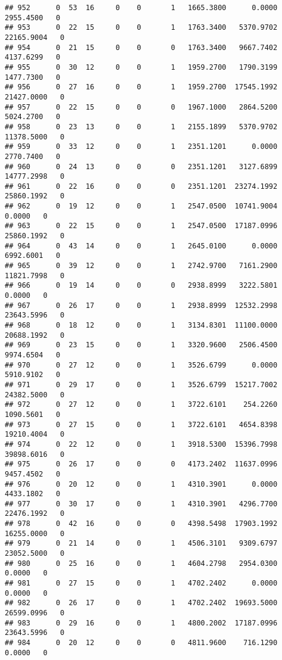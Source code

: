 \documentclass[
]{article}
\begin{document}
\begin{enumerate}
\begin{verbatim}
## 952      0  53  16     0    0       1   1665.3800      0.0000   2955.4500   0
## 953      0  22  15     0    0       1   1763.3400   5370.9702  22165.9004   0
## 954      0  21  15     0    0       0   1763.3400   9667.7402   4137.6299   0
## 955      0  30  12     0    0       1   1959.2700   1790.3199   1477.7300   0
## 956      0  27  16     0    0       1   1959.2700  17545.1992  21427.0000   0
## 957      0  22  15     0    0       0   1967.1000   2864.5200   5024.2700   0
## 958      0  23  13     0    0       1   2155.1899   5370.9702  11378.5000   0
## 959      0  33  12     0    0       1   2351.1201      0.0000   2770.7400   0
## 960      0  24  13     0    0       0   2351.1201   3127.6899  14777.2998   0
## 961      0  22  16     0    0       0   2351.1201  23274.1992  25860.1992   0
## 962      0  19  12     0    0       1   2547.0500  10741.9004      0.0000   0
## 963      0  22  15     0    0       1   2547.0500  17187.0996  25860.1992   0
## 964      0  43  14     0    0       1   2645.0100      0.0000   6992.6001   0
## 965      0  39  12     0    0       1   2742.9700   7161.2900  11821.7998   0
## 966      0  19  14     0    0       0   2938.8999   3222.5801      0.0000   0
## 967      0  26  17     0    0       1   2938.8999  12532.2998  23643.5996   0
## 968      0  18  12     0    0       1   3134.8301  11100.0000  20688.1992   0
## 969      0  23  15     0    0       1   3320.9600   2506.4500   9974.6504   0
## 970      0  27  12     0    0       1   3526.6799      0.0000   5910.9102   0
## 971      0  29  17     0    0       1   3526.6799  15217.7002  24382.5000   0
## 972      0  27  12     0    0       1   3722.6101    254.2260   1090.5601   0
## 973      0  27  15     0    0       1   3722.6101   4654.8398  19210.4004   0
## 974      0  22  12     0    0       1   3918.5300  15396.7998  39898.6016   0
## 975      0  26  17     0    0       0   4173.2402  11637.0996   9457.4502   0
## 976      0  20  12     0    0       1   4310.3901      0.0000   4433.1802   0
## 977      0  30  17     0    0       1   4310.3901   4296.7700  22476.1992   0
## 978      0  42  16     0    0       0   4398.5498  17903.1992  16255.0000   0
## 979      0  21  14     0    0       1   4506.3101   9309.6797  23052.5000   0
## 980      0  25  16     0    0       1   4604.2798   2954.0300      0.0000   0
## 981      0  27  15     0    0       1   4702.2402      0.0000      0.0000   0
## 982      0  26  17     0    0       1   4702.2402  19693.5000  26599.0996   0
## 983      0  29  16     0    0       1   4800.2002  17187.0996  23643.5996   0
## 984      0  20  12     0    0       0   4811.9600    716.1290      0.0000   0

\end{verbatim}
\end{enumerate}
\end{document}
